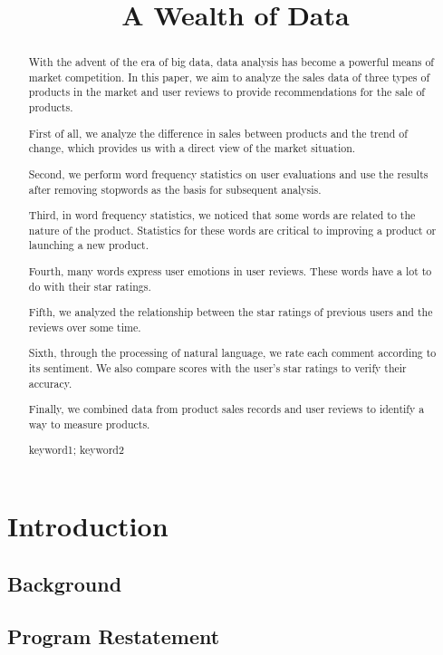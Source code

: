 \documentclass{mcmthesis}
\title{A Wealth of Data}
\begin{document}
	\begin{abstract}
		With the advent of the era of big data, data analysis has become a powerful means of market competition. In this paper, we aim to analyze the sales data of three types of products in the market and user reviews to provide recommendations for the sale of products.
		
		First of all, we analyze the difference in sales between products and the trend of change, which provides us with a direct view of the market situation.
		
		Second, we perform word frequency statistics on user evaluations and use the results after removing stopwords as the basis for subsequent analysis.
		
		Third, in word frequency statistics, we noticed that some words are related to the nature of the product. Statistics for these words are critical to improving a product or launching a new product.
		
		Fourth, many words express user emotions in user reviews. These words have a lot to do with their star ratings.
		
		Fifth, we analyzed the relationship between the star ratings of previous users and the reviews over some time.
		
		Sixth, through the processing of natural language, we rate each comment according to its sentiment. We also compare scores with the user's star ratings to verify their accuracy.
		
		Finally, we combined data from product sales records and user reviews to identify a way to measure products.
		\begin{keywords}
			keyword1; keyword2
		\end{keywords}
	\end{abstract}
	\maketitle
	\section{Introduction}
	
	\subsection{Background}
	
	
	\subsection{Program Restatement}
	
\end{document}
